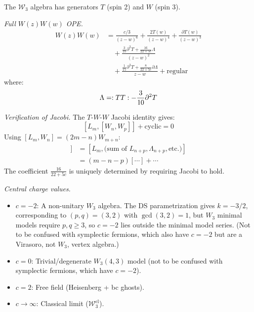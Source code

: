 \begin{computation}\label{comp:w3-coeff}
The $\mathcal{W}_3$ algebra has generators $T$ (spin 2) and $W$ (spin 3).

\emph{Full $W(z)W(w)$ OPE.}
\begin{align*}
W(z)W(w) &= \frac{c/3}{(z-w)^6} + \frac{2T(w)}{(z-w)^4} + \frac{\partial T(w)}{(z-w)^3} \\
&\quad + \frac{\frac{3}{10}\partial^2 T + \frac{16}{22+5c}\Lambda}{(z-w)^2} \\
&\quad + \frac{\frac{1}{15}\partial^3 T + \frac{8}{22+5c}\partial\Lambda}{z-w} + \text{regular}
\end{align*}
where:
\[
\Lambda = :{TT}: - \frac{3}{10}\partial^2 T
\]

\emph{Verification of Jacobi.} The $T$-$W$-$W$ Jacobi identity gives:
\[
[L_m, [W_n, W_p]] + \text{cyclic} = 0
\]
Using $[L_m, W_n] = (2m - n)W_{m+n}$:
\begin{align*}
[L_m, [W_n, W_p]] &= [L_m, \text{(sum of } L_{n+p}, \Lambda_{n+p}, \text{etc.)}] \\
&= (m - n - p)[\cdots] + \cdots
\end{align*}
The coefficient $\frac{16}{22+5c}$ is uniquely determined by requiring Jacobi to hold.

\emph{Central charge values.}
\begin{itemize}
\item $c = -2$: A non-unitary $W_3$ algebra.  The DS parametrization gives $k = -3/2$, corresponding to $(p,q) = (3,2)$ with $\gcd(3,2) = 1$, but $W_3$ minimal models require $p, q \geq 3$, so $c = -2$ lies outside the minimal model series.  (Not to be confused with symplectic fermions, which also have $c=-2$ but are a Virasoro, not $W_3$, vertex algebra.)
\item $c = 0$: Trivial/degenerate $W_3(4,3)$ model (not to be confused with symplectic fermions, which have $c=-2$).
\item $c = 2$: Free field (Heisenberg + bc ghosts).
\item $c \to \infty$: Classical limit ($\mathcal{W}_3^{\mathrm{cl}}$).
\end{itemize}
\end{computation}


